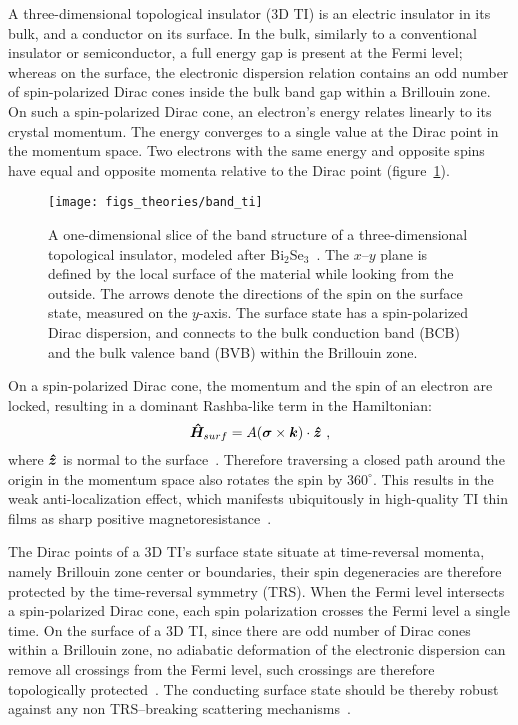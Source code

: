 A three-dimensional topological insulator (3D TI) is an electric insulator in its bulk, and a conductor on its surface. In the bulk, similarly to a conventional insulator or semiconductor, a full energy gap is present at the Fermi level; whereas on the surface, the electronic dispersion relation contains an odd number of spin-polarized Dirac cones inside the bulk band gap within a Brillouin zone. On such a spin-polarized Dirac cone, an electron's energy relates linearly to its crystal momentum. The energy converges to a single value at the Dirac point in the momentum space. Two electrons with the same energy and opposite spins have equal and opposite momenta relative to the Dirac point (figure~\ref{fig:intro_ti}).%
\begin{figure}[ht]%
    \centering%
    \texttt{[image: figs\_theories/band\_ti]}%
    \caption[Band structure of a 3D topological insulator]{\label{fig:intro_ti}A one-dimensional slice of the band structure of a three-dimensional topological insulator, modeled after Bi$_2$Se$_3$~\cite{TI_electronic_structure_zhang}. The $x$--$y$ plane is defined by the local surface of the material while looking from the outside. The arrows denote the directions of the spin on the surface state, measured on the $y$-axis. The surface state has a spin-polarized Dirac dispersion, and connects to the bulk conduction band (BCB) and the bulk valence band (BVB) within the Brillouin zone.}%
\end{figure}%

On a spin-polarized Dirac cone, the momentum and the spin of an electron are locked, resulting in a dominant Rashba-like term in the Hamiltonian:%
\begin{equation}%
    \op{H}_{surf} = A (\vec{\sigma} \times \vec{k}) \cdot \vu*{z}~,\label{eq:surf_Rashba}%
\end{equation}%
where $\vu*{z}$ is normal to the surface~\cite{TI_Qi, TI_electronic_structure_zhang, Liu2010}. Therefore traversing a closed path around the origin in the momentum space also rotates the spin by $360^\circ$. This results in the weak anti-localization effect, which manifests ubiquitously in high-quality TI thin films as sharp positive magnetoresistance~\cite{TI_WAL_Hongkong, TI_WAL_thickness, zhangli2012, zhangli2013}.

The Dirac points of a 3D TI's surface state situate at time-reversal momenta, namely Brillouin zone center or boundaries, their spin degeneracies are therefore protected by the time-reversal symmetry (TRS). When the Fermi level intersects a spin-polarized Dirac cone, each spin polarization crosses the Fermi level a single time. On the surface of a 3D TI, since there are odd number of Dirac cones within a Brillouin zone, no adiabatic deformation of the electronic dispersion can remove all crossings from the Fermi level, such crossings are therefore topologically protected~\cite{Kane2005}. The conducting surface state should be thereby robust against any non TRS--breaking scattering mechanisms~\cite{TI_Qi, TI_Col}.

